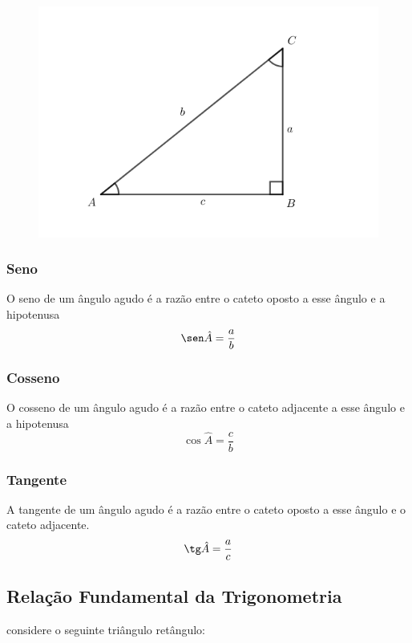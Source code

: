 \begin{figure}[H]
	\centering
	
	\includegraphics[scale=3.5]{imagens/triangulo-retangulo.png}

\end{figure}

\subsubsection{Seno}
O seno de um ângulo agudo é a razão entre o cateto oposto a esse ângulo e a hipotenusa
$$\sen\hat{A} = \dfrac{a}{b}$$

\subsubsection{Cosseno}
O cosseno de um ângulo agudo é a razão entre o cateto adjacente a esse ângulo e a hipotenusa
$$\cos \hat{A} = \dfrac{c}{b}$$

\subsubsection{Tangente}
A tangente de um ângulo agudo é a razão entre o cateto oposto a esse ângulo e o cateto adjacente.
$$\tg \hat{A} = \dfrac{a}{c}$$

\subsection{Relação Fundamental da Trigonometria}

considere o seguinte triângulo retângulo:

